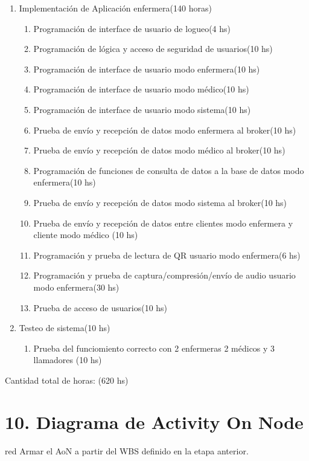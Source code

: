 \documentclass[
11pt, %
]{charter}
\begin{document}
\begin{enumerate}
\item Implementación de Aplicación enfermera(140 horas)
	\begin{enumerate}
	\item Programación de interface de usuario de logueo(4 hs)
	\item Programación de lógica y acceso de seguridad de usuarios(10 hs)
	\item Programación de interface de usuario modo enfermera(10 hs)
	\item Programación de interface de usuario modo médico(10 hs)
	\item Programación de interface de usuario modo sistema(10 hs)
	\item Prueba de envío y recepción de datos modo enfermera al broker(10 hs)
	\item Prueba de envío y recepción de datos modo médico al broker(10 hs)
	\item Programación de funciones de consulta de datos a la base de datos modo enfermera(10 hs)
	\item Prueba de envío y recepción de datos modo sistema al broker(10 hs)
	\item Prueba de envío y recepción de datos entre clientes modo enfermera y cliente modo médico (10 hs)
	\item Programación y prueba de lectura de QR usuario modo enfermera(6 hs)
	\item Programación y prueba de captura/compresión/envío de audio usuario modo enfermera(30 hs)
	\item Prueba de acceso de usuarios(10 hs)
	\end{enumerate}
\item Testeo de sistema(10 hs)
	\begin{enumerate}	
	\item Prueba del funciomiento correcto con 2 enfermeras 2 médicos y 3 llamadores  (10 hs)
	\end{enumerate}	
\end{enumerate}

Cantidad total de horas: (620 hs)



\section{10. Diagrama de Activity On Node}
\label{sec:AoN}

\begin{consigna}{red}
Armar el AoN a partir del WBS definido en la etapa anterior. 



\end{consigna}
\end{document}
